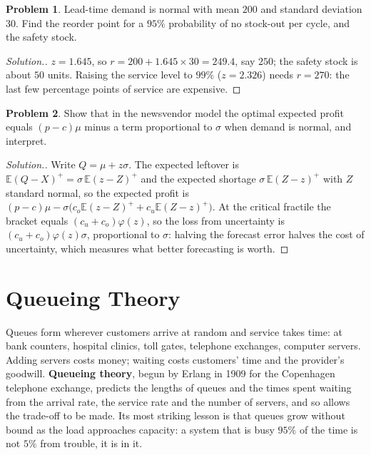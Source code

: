\documentclass[11pt,a4paper]{article}
\numberwithin{equation}{section}
\theoremstyle{definition}
\newtheorem{problemx}{Problem}[subsection]
\newenvironment{problem}{\begin{problemx}}{\end{problemx}}
\newenvironment{solution}
  {\renewcommand{\qedsymbol}{}\begin{proof}[\textit{Solution}.]}
  {\end{proof}}
\begin{document}
\begin{problem}
Lead-time demand is normal with mean $200$ and standard deviation $30$. Find the reorder point for a $95\%$ probability of no stock-out per cycle, and the safety stock.
\end{problem}

\begin{solution}
$z = 1.645$, so $r = 200 + 1.645 \times 30 = 249.4$, say $250$; the safety stock is about $50$ units. Raising the service level to $99\%$ ($z = 2.326$) needs $r = 270$: the last few percentage points of service are expensive.
\end{solution}

\begin{problem}
Show that in the newsvendor model the optimal expected profit equals $(p - c)\mu$ minus a term proportional to $\sigma$ when demand is normal, and interpret.
\end{problem}

\begin{solution}
Write $Q = \mu + z\sigma$. The expected leftover is $\mathbb E(Q - X)^+ = \sigma\,\mathbb E(z - Z)^+$ and the expected shortage $\sigma\,\mathbb E(Z - z)^+$ with $Z$ standard normal, so the expected profit is $(p - c)\mu - \sigma\bigl(c_o\mathbb E(z - Z)^+ + c_u\mathbb E(Z - z)^+\bigr)$. At the critical fractile the bracket equals
$(c_u + c_o)\varphi(z)$, so the loss from uncertainty is $(c_u + c_o)\varphi(z)\sigma$, proportional to $\sigma$: halving the forecast error halves the cost of uncertainty, which measures what better forecasting is worth.
\end{solution}

\section{Queueing Theory}
\label{sec:queues}

Queues form wherever customers arrive at random and service takes time: at bank counters, hospital clinics, toll gates, telephone exchanges, computer servers. Adding servers costs money; waiting costs customers' time and the provider's goodwill. \textbf{Queueing theory}, begun by Erlang in 1909 for the Copenhagen telephone exchange, predicts
the lengths of queues and the times spent waiting from the arrival rate, the service rate and the number of servers, and so allows the trade-off to be made. Its most striking lesson is that queues grow without bound as the load approaches capacity: a system that is busy $95\%$ of the time is not $5\%$ from trouble, it is in it.
\end{document}
